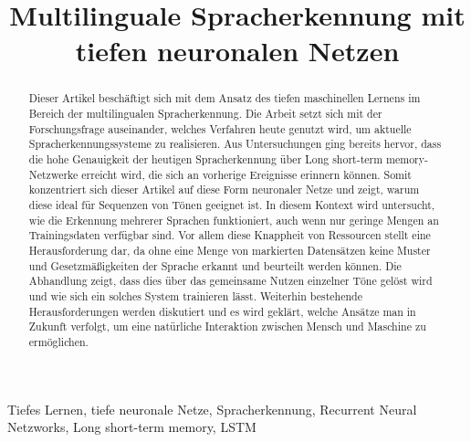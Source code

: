 \documentclass[conference]{IEEEtran}
\begin{document}
	
	\title{Multilinguale Spracherkennung mit tiefen neuronalen
	Netzen\\
	}
	
	\author{
		\and
		\and
	
	}
	
	\maketitle
	
	\begin{abstract}
	Dieser Artikel beschäftigt sich mit dem Ansatz des tiefen maschinellen Lernens im Bereich der multilingualen Spracherkennung. Die Arbeit setzt sich mit der Forschungsfrage auseinander, welches Verfahren heute genutzt wird, um aktuelle Spracherkennungssysteme zu realisieren. Aus Untersuchungen ging bereits hervor, dass die hohe Genauigkeit der heutigen Spracherkennung über Long short-term memory-Netzwerke erreicht wird, die sich an vorherige Ereignisse erinnern können. Somit konzentriert sich dieser Artikel auf diese Form neuronaler Netze und zeigt, warum diese ideal für Sequenzen von Tönen geeignet ist. In diesem Kontext wird untersucht, wie die Erkennung mehrerer Sprachen funktioniert, auch wenn nur geringe Mengen an Trainingsdaten verfügbar sind. Vor allem diese Knappheit von Ressourcen stellt eine Herausforderung dar, da ohne eine Menge von markierten Datensätzen keine Muster und Gesetzmäßigkeiten der Sprache erkannt und beurteilt werden können. Die Abhandlung zeigt, dass dies über das gemeinsame Nutzen einzelner Töne gelöst wird und wie sich ein solches System trainieren lässt. Weiterhin bestehende Herausforderungen werden diskutiert und es wird geklärt, welche Ansätze man in Zukunft verfolgt, um eine natürliche Interaktion zwischen Mensch und Maschine zu ermöglichen.
	\end{abstract}
	
	\begin{IEEEkeywords}
		Tiefes Lernen, tiefe neuronale Netze, Spracherkennung, Recurrent Neural Netzworks, Long short-term memory, LSTM 
	\end{IEEEkeywords}
	

	
	
	
	
	
	
	
	
	
	
	
\end{document}
